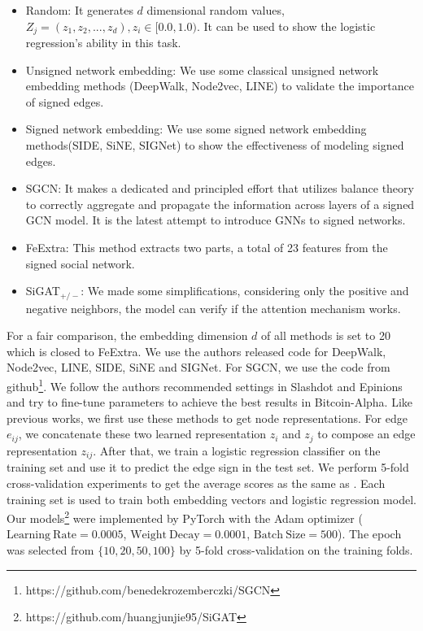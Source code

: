 \documentclass[runningheads]{llncs}
\begin{document}
\begin{itemize}
    \item Random: It generates $d$ dimensional random values, $Z_j = (z_1, z_2, ...,z_{d}), z_i \in [0.0, 1.0)$. It can be used to show the logistic regression's ability in this task.
    
    \item Unsigned network embedding: We use some classical unsigned network embedding methods (\eg DeepWalk\cite{perozzi2014deepwalk},  Node2vec\cite{grover2016node2vec}, LINE\cite{tang2015line}) to validate the importance of signed edges.
    
    \item Signed network embedding: We use some signed network embedding methods(\eg SIDE\cite{kim2018side}, SiNE\cite{wang2017signed}, SIGNet\cite{islam2018signet}) to show the effectiveness of modeling signed edges.

    \item SGCN\cite{derr2018signed}: It makes a dedicated and principled effort that utilizes balance theory to correctly aggregate and propagate the information across layers of a signed GCN model. It is the latest attempt to introduce GNNs to signed networks.

    \item FeExtra\cite{leskovec2010predicting}: This method extracts two parts, a total of 23 features from the signed social network. 


    \item SiGAT$_{\mathrm{+/-}}$: We made some simplifications, considering only the positive and negative neighbors, the model can verify if the attention mechanism works.
\end{itemize}

For a fair comparison, the embedding dimension $d$ of all methods is set to 20 which is closed to FeExtra\cite{leskovec2010predicting}.
We use the authors released code for DeepWalk, Node2vec, LINE, SIDE, SiNE and SIGNet. For SGCN, we use the code from github\footnote{https://github.com/benedekrozemberczki/SGCN}. 
We follow the authors recommended settings in Slashdot and Epinions and try to fine-tune parameters to achieve the best results in Bitcoin-Alpha.
Like previous works\cite{kim2018side, wang2017signed, derr2018signed}, we first use these methods to get node representations. 
For edge $e_{ij}$, we concatenate these two learned representation $z_i$ and $z_j$ to compose an edge representation $z_{ij}$. 
After that, we train a logistic regression classifier on the training set and use it to predict the edge sign in the test set. 
We perform 5-fold cross-validation experiments to get the average scores as the same as \cite{kim2018side}. 
Each training set is used to train both embedding vectors and logistic regression model.
Our models\footnote{https://github.com/huangjunjie95/SiGAT} were implemented by PyTorch with the Adam optimizer ($\mathrm{Learning~Rate}=0.0005$, $\mathrm{Weight~Decay} = 0.0001$, $\mathrm{Batch~Size} = 500$). 
The epoch was selected from $\{10, 20, 50, 100\}$ by 5-fold cross-validation on the training folds.
\end{document}
